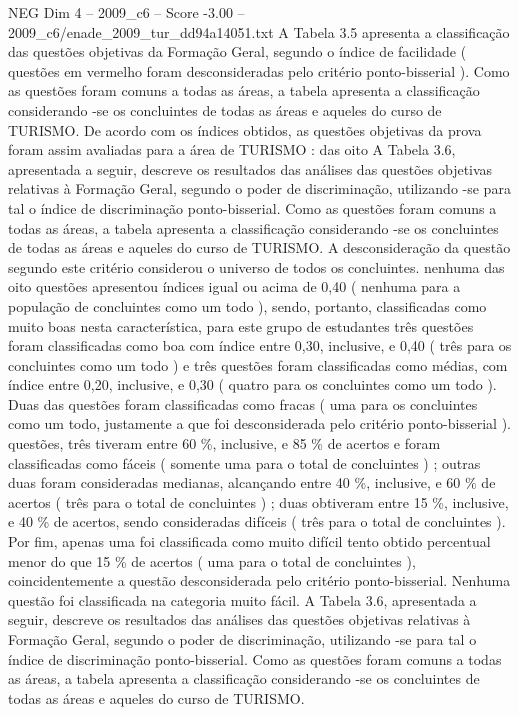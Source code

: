 \begin{textsample}{NEG Dim 4 – 2009\_c6 – Score -3.00 – 2009\_c6/enade\_2009\_tur\_dd94a14051.txt}
A Tabela 3.5 apresenta a classificação das questões objetivas da Formação Geral, segundo o índice de facilidade ( questões em vermelho foram desconsideradas pelo critério ponto-bisserial ).
Como as questões foram comuns a todas as áreas, a tabela apresenta a classificação considerando -se os concluintes de todas as áreas e aqueles do curso de TURISMO.
De acordo com os índices obtidos, as questões objetivas da prova foram assim avaliadas para a área de TURISMO : das oito A Tabela 3.6, apresentada a seguir, descreve os resultados das análises das questões objetivas relativas à Formação Geral, segundo o poder de discriminação, utilizando -se para tal o índice de discriminação ponto-bisserial.
Como as questões foram comuns a todas as áreas, a tabela apresenta a classificação considerando -se os concluintes de todas as áreas e aqueles do curso de TURISMO.
A desconsideração da questão segundo este critério considerou o universo de todos os concluintes. nenhuma das oito questões apresentou índices igual ou acima de 0,40 ( nenhuma para a população de concluintes como um todo ), sendo, portanto, classificadas como muito boas nesta característica, para este grupo de estudantes três questões foram classificadas como boa com índice entre 0,30, inclusive, e 0,40 ( três para os concluintes como um todo ) e três questões foram classificadas como médias, com índice entre 0,20, inclusive, e 0,30 ( quatro para os concluintes como um todo ).
Duas das questões foram classificadas como fracas ( uma para os concluintes como um todo, justamente a que foi desconsiderada pelo critério ponto-bisserial ). questões, três tiveram entre 60 \%, inclusive, e 85 \% de acertos e foram classificadas como fáceis ( somente uma para o total de concluintes ) ; outras duas foram consideradas medianas, alcançando entre 40 \%, inclusive, e 60 \% de acertos ( três para o total de concluintes ) ; duas obtiveram entre 15 \%, inclusive, e 40 \% de acertos, sendo consideradas difíceis ( três para o total de concluintes ).
Por fim, apenas uma foi classificada como muito difícil tento obtido percentual menor do que 15 \% de acertos ( uma para o total de concluintes ), coincidentemente a questão desconsiderada pelo critério ponto-bisserial.
Nenhuma questão foi classificada na categoria muito fácil.
A Tabela 3.6, apresentada a seguir, descreve os resultados das análises das questões objetivas relativas à Formação Geral, segundo o poder de discriminação, utilizando -se para tal o índice de discriminação ponto-bisserial.
Como as questões foram comuns a todas as áreas, a tabela apresenta a classificação considerando -se os concluintes de todas as áreas e aqueles do curso de TURISMO.

\end{textsample}
